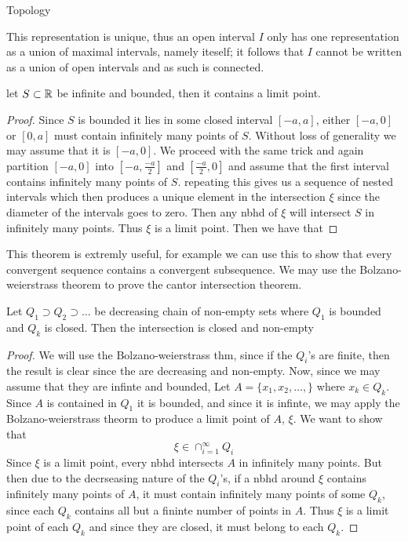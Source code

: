 \begin{chapter}{Topology}
    \begin{rem}
        This representation is unique, thus an open interval $I$ only has one representation as a union of maximal intervals, namely iteself; it follows 
        that $I$ cannot be written as a union of open intervals and as such is connected. 
    \end{rem}

    
    
    \begin{thm}
        let $S \subset \mathbb{R}$ be infinite and bounded, then it contains a limit point. 
    \end{thm}

    \begin{proof}
        Since $S$ is bounded it lies in some closed interval $[-a, a]$, either $[-a, 0]$ or $[0, a]$ must contain infinitely many points of $S$. 
        Without loss of generality we may assume that it is $[-a, 0]$. We proceed with the same trick and again partition $[-a, 0]$ into 
        $[-a, \frac{-a}{2}]$ and $[\frac{-a}{2}, 0]$ and assume that the first interval contains infinitely many points of $S$. 
        repeating this gives us a sequence of nested intervals which then produces a unique element in the intersection $\xi$ since the diameter of 
        the intervals goes to zero. Then any nbhd of $\xi$ will intersect $S$ in infinitely many points. Thus $\xi$ is a limit point. 
        Then we have that 
    \end{proof}

    This theorem is extremly useful, for example we can use this to show that every convergent sequence contains a convergent subsequence. 
    We may use the Bolzano-weierstrass theorem to prove the cantor intersection theorem. 

    
    \begin{thm}
        Let $Q_1 \supset Q_2 \supset \dots$ be decreasing chain of non-empty sets where $Q_1$ is bounded and $Q_k$ is closed. 
        Then the intersection is closed and non-empty
    \end{thm}

    \begin{proof}
        We will use the Bolzano-weierstrass thm, since if the $Q_i$'s are finite, then the result is clear since the are decreasing and non-empty. 
        Now, since we may assume that they are infinte and bounded, Let $A = \{x_1, x_2, \dots, \}$ where $x_k \in Q_k$. Since $A$ is contained in $Q_1$ 
        it is bounded, and since it is infinte, we may apply the Bolzano-weierstrass theorm to produce a limit point of $A$, $\xi$. We want to show that 
        \[\xi \in \cap_{i =1}^\infty Q_i\]
        Since $\xi$ is a limit point, every nbhd intersects $A$ in infinitely many points. But then due to the decrseasing nature of the $Q_i$'s, 
        if a nbhd around $\xi$ contains infinitely many points of $A$, it must contain infinitely many points of some $Q_k$, since each $Q_k$ contains all but a fininte number of points in $A$. Thus $\xi$ is a limit point 
        of each $Q_k$ and since they are closed, it must belong to each $Q_k$. 
    \end{proof}


\end{chapter}
